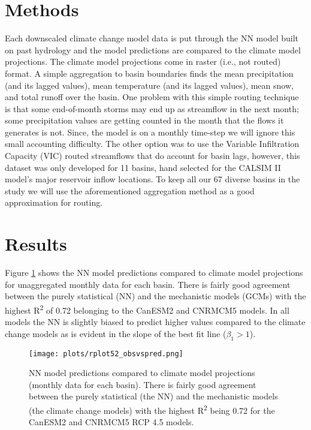 \section{Methods}
Each downscaled climate change model data is put through the NN model built on past hydrology and the model predictions are compared to the climate model projections. The climate model projections come in raster (i.e., not routed) format. A simple aggregation to basin boundaries finds the mean precipitation (and its lagged values), mean temperature (and its lagged values), mean snow, and total runoff over the basin. One problem with this simple routing technique is that some end-of-month storms may end up as streamflow in the next month; some precipitation values are getting counted in the month that the flows it generates is not. Since, the model is on a monthly time-step we will ignore this small accounting difficulty. The other option was to use the Variable Infiltration Capacity (VIC) routed streamflows that do account for basin lags, however, this dataset was only developed for 11 basins, hand selected for the CALSIM II model's major reservoir inflow locations. To keep all our 67 diverse basins in the study we will use the aforementioned aggregation method as a good approximation for routing. 
 
\section{Results}
Figure \ref{fig:modcomp} shows the NN model predictions compared to climate model projections for unaggregated monthly data for each basin. There is fairly good agreement between the purely statistical (NN) and the mechanistic models (GCMs) with the highest R\textsuperscript{2} of 0.72 belonging to the CanESM2 and CNRMCM5 models. In all models the NN is slightly biased to predict higher values compared to the climate change models as is evident in the slope of the best fit line ($\beta_1>1$). 

\begin{figure}
	\centering
	\texttt{[image: plots/rplot52\_obsvspred.png]}
	\caption[NN model predictions compared to climate model projections.]{NN model predictions compared to climate model projections (monthly data for each basin). There is fairly good agreement between the purely statistical (the NN) and the mechanistic models (the climate change models) with the highest R\textsuperscript{2} being 0.72 for the CanESM2 and CNRMCM5 RCP 4.5 models.} 
	\label{fig:modcomp}
\end{figure}


